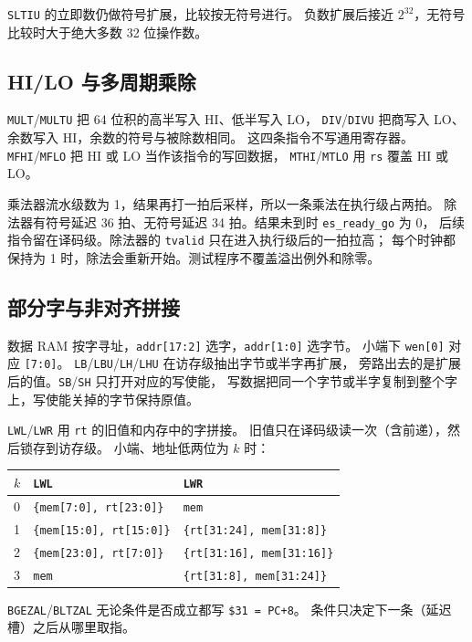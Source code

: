 \documentclass{article}
\begin{document}
\texttt{SLTIU} 的立即数仍做符号扩展，比较按无符号进行。
负数扩展后接近 $2^{32}$，无符号比较时大于绝大多数 32 位操作数。

\subsection{HI/LO 与多周期乘除}
\texttt{MULT}/\texttt{MULTU} 把 64 位积的高半写入 HI、低半写入 LO，
\texttt{DIV}/\texttt{DIVU} 把商写入 LO、余数写入 HI，余数的符号与被除数相同。
这四条指令不写通用寄存器。\texttt{MFHI}/\texttt{MFLO} 把 HI 或 LO 当作该指令的写回数据，
\texttt{MTHI}/\texttt{MTLO} 用 \texttt{rs} 覆盖 HI 或 LO。

乘法器流水级数为 1，结果再打一拍后采样，所以一条乘法在执行级占两拍。
除法器有符号延迟 36 拍、无符号延迟 34 拍。结果未到时 \texttt{es\_ready\_go} 为 0，
后续指令留在译码级。除法器的 \texttt{tvalid} 只在进入执行级后的一拍拉高；
每个时钟都保持为 1 时，除法会重新开始。测试程序不覆盖溢出例外和除零。

\subsection{部分字与非对齐拼接}
数据 RAM 按字寻址，\texttt{addr[17:2]} 选字，\texttt{addr[1:0]} 选字节。
小端下 \texttt{wen[0]} 对应 \texttt{[7:0]}。
\texttt{LB}/\texttt{LBU}/\texttt{LH}/\texttt{LHU} 在访存级抽出字节或半字再扩展，
旁路出去的是扩展后的值。\texttt{SB}/\texttt{SH} 只打开对应的写使能，
写数据把同一个字节或半字复制到整个字上，写使能关掉的字节保持原值。

\texttt{LWL}/\texttt{LWR} 用 \texttt{rt} 的旧值和内存中的字拼接。
旧值只在译码级读一次（含前递），然后锁存到访存级。
小端、地址低两位为 $k$ 时：

\begin{center}
\begin{tabular}{lll}
\toprule
$k$ & \texttt{LWL} & \texttt{LWR} \\
\midrule
0 & \texttt{\{mem[7:0], rt[23:0]\}} & \texttt{mem} \\
1 & \texttt{\{mem[15:0], rt[15:0]\}} & \texttt{\{rt[31:24], mem[31:8]\}} \\
2 & \texttt{\{mem[23:0], rt[7:0]\}} & \texttt{\{rt[31:16], mem[31:16]\}} \\
3 & \texttt{mem} & \texttt{\{rt[31:8], mem[31:24]\}} \\
\bottomrule
\end{tabular}
\end{center}

\texttt{BGEZAL}/\texttt{BLTZAL} 无论条件是否成立都写 \texttt{\$31 = PC+8}。
条件只决定下一条（延迟槽）之后从哪里取指。
\end{document}
